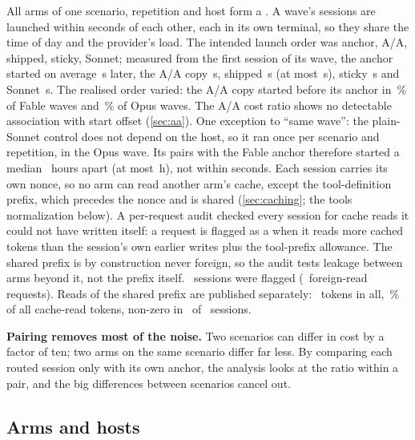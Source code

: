 All arms of one scenario, repetition and host form a . A wave's sessions are launched within
seconds of each other, each in its own terminal, so they share the time of day and the provider's load.
The intended launch order was anchor, A/A, shipped, sticky, Sonnet; measured from the first session of its wave,
the anchor started on average \StaggerAnchor\,s later, the A/A copy \StaggerAA\,s, shipped \StaggerShipped\,s (at
most \StaggerShippedMax\,s), sticky \StaggerSticky\,s and Sonnet \StaggerSonnet\,s. The realised order varied:
the A/A copy started before its anchor in \RvAAFirstFable\,\% of Fable waves and \RvAAFirstOpus\,\% of Opus waves.
The A/A cost ratio shows no detectable association with start offset (\cref{sec:aa}). One exception to ``same wave'': the plain-Sonnet
control does not depend on the host, so it ran once per scenario and repetition, in the Opus wave. Its pairs with
the Fable anchor therefore started a median \RvSonnetWaveMedianH\ hours apart (at most \RvSonnetWaveMaxH\,h), not
within seconds. Each session carries its own
nonce, so no arm can read another arm's cache, except the tool-definition prefix, which precedes the nonce and is
shared (\cref{sec:caching}; the tools normalization below). A per-request audit checked every
session for cache reads it could not have written itself: a request is flagged as a  when it reads
more cached tokens than the session's own earlier writes plus the tool-prefix allowance. The shared prefix is by
construction never foreign, so the audit tests leakage between arms beyond it, not the prefix itself.
\AuditFlagged\ sessions were flagged (\RgForeignRequests\ foreign-read requests). Reads of the shared prefix are
published separately: \RgCrossTokens\ tokens in all, \RgCrossShare\,\% of all cache-read tokens, non-zero in
\RgCrossSessions\ of \NSessions\ sessions.

\begin{keyidea}
\textbf{Pairing removes most of the noise.} Two scenarios can differ in cost by a factor of ten; two arms on
the same scenario differ far less. By comparing each routed session only with its own anchor, the
analysis looks at the ratio within a pair, and the big differences between scenarios cancel out.
\end{keyidea}

\subsection{Arms and hosts}

